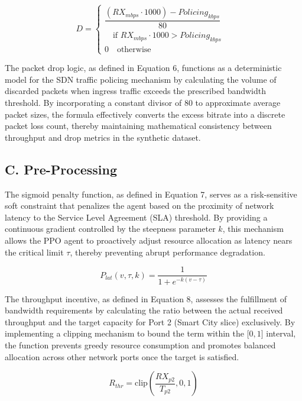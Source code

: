 \documentclass[conference]{IEEEtran}
\begin{document}
\begin{equation}\label{eq:6}
D = \begin{cases}
\dfrac{({RX}_{mbps}\cdot 1000) - {Policing}_{kbps}}{80} & \\
\quad \text{if } {RX}_{mbps}\cdot 1000 > {Policing}_{kbps} & \\[2pt]
0 \quad \text{otherwise} &
\end{cases}
\end{equation}

The packet drop logic, as defined in Equation 6, functions as a deterministic model for the SDN traffic policing mechanism by calculating the volume of discarded packets when ingress traffic exceeds the prescribed bandwidth threshold. By incorporating a constant divisor of 80 to approximate average packet sizes, the formula effectively converts the excess bitrate into a discrete packet loss count, thereby maintaining mathematical consistency between throughput and drop metrics in the synthetic dataset.

\subsection{C. Pre-Processing}\label{c.-pre-processing}

The sigmoid penalty function, as defined in Equation 7, serves as a risk-sensitive soft constraint that penalizes the agent based on the proximity of network latency to the Service Level Agreement (SLA) threshold. By providing a continuous gradient controlled by the steepness parameter \(k\), this mechanism allows the PPO agent to proactively adjust resource allocation as latency nears the critical limit \(\tau\), thereby preventing abrupt performance degradation.

\begin{equation}\label{eq:7}
P_{lat}(v,\tau,k) = \frac{1}{1 + e^{- k(v - \tau)}}
\end{equation}

The throughput incentive, as defined in Equation 8, assesses the fulfillment of bandwidth requirements by calculating the ratio between the actual received throughput and the target capacity for Port 2 (Smart City slice) exclusively. By implementing a clipping mechanism to bound the term within the \(\lbrack 0,1\rbrack\) interval, the function prevents greedy resource consumption and promotes balanced allocation across other network ports once the target is satisfied.

\begin{equation}\label{eq:8}
R_{thr} = \text{clip}\left( \frac{RX_{p2}}{T_{p2}},0,1 \right)
\end{equation}
\end{document}
